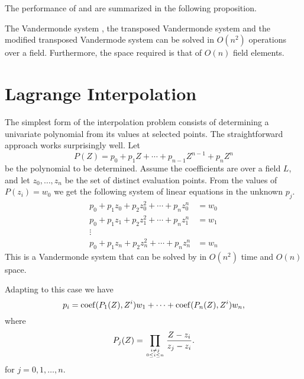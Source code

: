 \noindent
The performance of  and
 are summarized in the following
proposition.

\begin{proposition}
The Vandermonde system , the transposed
Vandermonde system  and the modified
transposed Vandermode system  can be solved in
$O(n^2)$ operations over a field.  Furthermore, the space required
is that of $O(n)$ field elements.
\end{proposition}

\section{Lagrange Interpolation}
\label{Interp:Lagrange:Sec}

The simplest form of the interpolation problem consists of determining
a univariate polynomial from its values at selected points.  The
straightforward approach works surprisingly well.  Let
\[
P(Z) = p_0 + p_1 Z + \cdots + p_{n-1} Z^{n-1} + p_n Z^n
\]
be the polynomial to be determined.  Assume the coefficients are over
a field $L$, and let $z_0, \ldots, z_n$ be the set of distinct
evaluation points.  From the values of $P(z_i) = w_0$ we get the
following system of linear equations in the unknown $p_j$.
\[
\begin{aligned}
p_0 + p_1 z_0 + p_2 z_0^2 + \cdots + p_n z_0^n &=  w_0\\
p_0 + p_1 z_1 + p_2 z_1^2 + \cdots + p_n z_1^n &=  w_1\\
\vdots&\\
p_0 + p_1 z_n + p_2 z_n^2 + \cdots + p_n z_n^n &=  w_n
\end{aligned}
\]
This is a Vandermonde system that can be solved by
 in $O(n^2)$ time and $O(n)$ space.

Adapting  to this case we have
\[
p_i = \mathop{\rm coef}\nolimits(P_1(Z), Z^{i}) w_1 + \cdots
       + \mathop{\rm coef}\nolimits(P_n(Z), Z^{i}) w_n,
\]
where 
\[
P_j(Z) = \prod_{i\not=j \atop 0\le i\le n}{Z - z_i \over z_j - z_i}.
\]
for $j = 0, 1, \ldots, n$.

